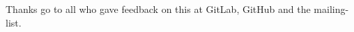 \documentclass{InsightArticle}
\begin{document}
Thanks go to all who gave feedback on this at GitLab, GitHub and the mailing-list.



%
%

\renewcommand{\UrlBreaks}{\do\-\do\_}%
%

\end{document}
